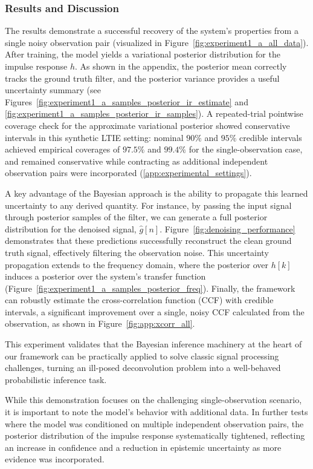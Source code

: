 \documentclass[preprint,1p,times,authoryear]{elsarticle}
\begin{document}
\subsubsection{Results and Discussion}
The results demonstrate a successful recovery of the system's properties from a single noisy observation pair (visualized in Figure~\ref{fig:experiment1_a_all_data}). After training, the model yields a variational posterior distribution for the impulse response $h$. As shown in the appendix, the posterior mean correctly tracks the ground truth filter, and the posterior variance provides a useful uncertainty summary (see Figures~\ref{fig:experiment1_a_samples_posterior_ir_estimate} and \ref{fig:experiment1_a_samples_posterior_ir_samples}). A repeated-trial pointwise coverage check for the approximate variational posterior showed conservative intervals in this synthetic LTIE setting: nominal $90\%$ and $95\%$ credible intervals achieved empirical coverages of $97.5\%$ and $99.4\%$ for the single-observation case, and remained conservative while contracting as additional independent observation pairs were incorporated (\ref{app:experimental_settings}).

A key advantage of the Bayesian approach is the ability to propagate this learned uncertainty to any derived quantity. For instance, by passing the input signal through posterior samples of the filter, we can generate a full posterior distribution for the denoised signal, $\hat{g}[n]$. Figure~\ref{fig:denoising_performance} demonstrates that these predictions successfully reconstruct the clean ground truth signal, effectively filtering the observation noise. This uncertainty propagation extends to the frequency domain, where the posterior over $h[k]$ induces a posterior over the system's transfer function (Figure~\ref{fig:experiment1_a_samples_posterior_freq}). Finally, the framework can robustly estimate the cross-correlation function (CCF) with credible intervals, a significant improvement over a single, noisy CCF calculated from the observation, as shown in Figure~\ref{fig:app:xcorr_all}.

This experiment validates that the Bayesian inference machinery at the heart of our framework can be practically applied to solve classic signal processing challenges, turning an ill-posed deconvolution problem into a well-behaved probabilistic inference task. 

While this demonstration focuses on the challenging single-observation scenario, it is important to note the model's behavior with additional data. In further tests where the model was conditioned on multiple independent observation pairs, the posterior distribution of the impulse response systematically tightened, reflecting an increase in confidence and a reduction in epistemic uncertainty as more evidence was incorporated.
\end{document}
